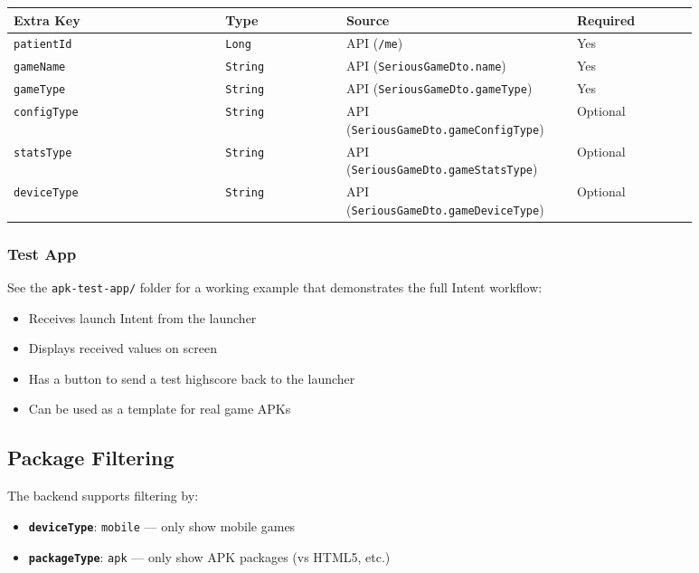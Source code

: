 \begin{longtable}{p{0.28\linewidth}p{0.16\linewidth}p{0.28\linewidth}p{0.16\linewidth}}
\toprule
Extra Key & Type & Source & Required \\
\midrule
\endhead
\bottomrule
\endlastfoot
\texttt{patientId} & \texttt{Long} & API (\texttt{/me}) & Yes \\
\texttt{gameName} & \texttt{String} & API (\texttt{SeriousGameDto.name}) & Yes \\
\texttt{gameType} & \texttt{String} & API (\texttt{SeriousGameDto.gameType}) & Yes \\
\texttt{configType} & \texttt{String} & API (\texttt{SeriousGameDto.gameConfigType}) & Optional \\
\texttt{statsType} & \texttt{String} & API (\texttt{SeriousGameDto.gameStatsType}) & Optional \\
\texttt{deviceType} & \texttt{String} & API (\texttt{SeriousGameDto.gameDeviceType}) & Optional \\
\end{longtable}

\subsubsection{Test App}\label{test-app}

See the \texttt{apk-test-app/} folder for a working example that demonstrates the full Intent workflow:

\begin{itemize}
\item Receives launch Intent from the launcher
\item Displays received values on screen
\item Has a button to send a test highscore back to the launcher
\item Can be used as a template for real game APKs
\end{itemize}
\subsection{Package Filtering}\label{package-filtering}

The backend supports filtering by:

\begin{itemize}
\tightlist
\item
  \textbf{\texttt{deviceType}}: \texttt{mobile} --- only show mobile
  games
\item
  \textbf{\texttt{packageType}}: \texttt{apk} --- only show APK packages
  (vs HTML5, etc.)
\end{itemize}

